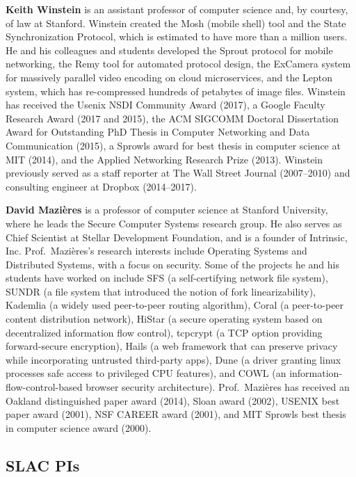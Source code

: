 \documentclass[11pt]{article}
\newcommand{\slim}{\vspace{\baselineskip}}
\begin{document}
\noindent \textbf{Keith Winstein} is an assistant professor of
computer science and, by courtesy, of law at Stanford. Winstein
created the Mosh (mobile shell) tool and the State Synchronization
Protocol, which is estimated to have more than a million users. He and
his colleagues and students developed the Sprout protocol for mobile
networking, the Remy tool for automated protocol design, the ExCamera
system for massively parallel video encoding on cloud microservices,
and the Lepton system, which has re-compressed hundreds of petabytes
of image files. Winstein has received the Usenix NSDI Community Award
(2017), a Google Faculty Research Award (2017 and 2015), the ACM
SIGCOMM Doctoral Dissertation Award for Outstanding PhD Thesis in
Computer Networking and Data Communication (2015), a Sprowls award for
best thesis in computer science at MIT (2014), and the Applied
Networking Research Prize (2013). Winstein previously served as a
staff reporter at The Wall Street Journal (2007--2010) and consulting
engineer at Dropbox (2014--2017).

\slim

\noindent \textbf{David Mazi\`{e}res} is a professor of computer
science at Stanford University, where he leads the Secure Computer
Systems research group. He also serves as Chief Scientist at Stellar
Development Foundation, and is a founder of Intrinsic,
Inc. Prof.~Mazi\`{e}res's research interests include Operating Systems
and Distributed Systems, with a focus on security. Some of
the projects he and his students have worked on include SFS (a
self-certifying network file system), SUNDR (a file system that
introduced the notion of fork linearizability), Kademlia (a widely
used peer-to-peer routing algorithm), Coral (a peer-to-peer content
distribution network), HiStar (a secure operating system based on
decentralized information flow control), tcpcrypt (a TCP option
providing forward-secure encryption), Hails (a web framework that can
preserve privacy while incorporating untrusted third-party apps), Dune
(a driver granting linux processes safe access to privileged CPU
features), and COWL (an information-flow-control-based browser
security architecture). Prof.~Mazi\`{e}res has received an Oakland distinguished paper award (2014), Sloan award
(2002), USENIX best paper award (2001), NSF CAREER award (2001), and MIT
Sprowls best thesis in computer science award (2000).

\subsection{SLAC PIs}
\end{document}
